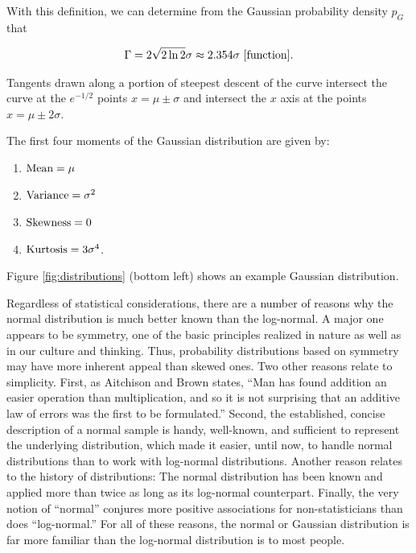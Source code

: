 \documentclass[a4paper,10pt]{article}
\begin{document}
{\noindent}With this definition, we can determine from the Gaussian probability density $p_G$ that

\begin{align*}
    \Gamma=2\sqrt{2\ln2}\sigma \approx 2.354\sigma ~ [{\rm function}].
\end{align*}

{\noindent}Tangents drawn along a portion of steepest descent of the curve intersect the curve at the $e^{-1/2}$ points $x=\mu\pm\sigma$ and intersect the $x$ axis at the points $x=\mu\pm2\sigma$.

{\noindent}The first four moments of the Gaussian distribution are given by:

\begin{enumerate}
    \item ${\rm Mean} = \mu$
    \item ${\rm Variance} = \sigma^2$
    \item ${\rm Skewness} = 0$
    \item ${\rm Kurtosis} = 3\sigma^4$.
\end{enumerate}

{\noindent}Figure \ref{fig:distributions} (bottom left) shows an example Gaussian distribution.

{\noindent}Regardless of statistical considerations, there are a number of reasons why the normal distribution is much better known than the log-normal. A major one appears to be symmetry, one of the basic principles realized in nature as well as in our culture and thinking. Thus, probability distributions based on symmetry may have more inherent appeal than skewed ones. Two other reasons relate to simplicity. First, as Aitchison and Brown states, ``Man has found addition an easier operation than multiplication, and so it is not surprising that an additive law of errors was the first to be formulated.'' Second, the established, concise description of a normal sample is handy, well-known, and sufficient to represent the underlying distribution, which made it easier, until now, to handle normal distributions than to work with log-normal distributions. Another reason relates to the history of distributions: The normal distribution has been known and applied more than twice as long as its log-normal counterpart. Finally, the very notion of ``normal'' conjures more positive associations for non-statisticians than does ``log-normal.'' For all of these reasons, the normal or Gaussian distribution is far more familiar than the log-normal distribution is to most people.
\end{document}
